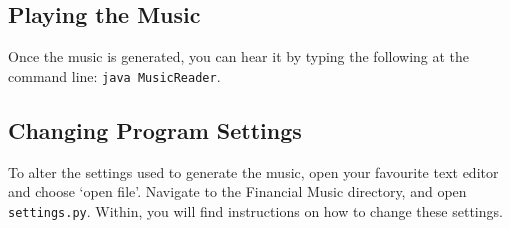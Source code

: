 \subsection*{Playing the Music}

Once the music is generated, you can hear it by typing the following at the command line: \texttt{java MusicReader}.

\subsection*{Changing Program Settings}

To alter the settings used to generate the music, open your favourite text editor and choose `open file'. Navigate to the Financial Music directory, and open \texttt{settings.py}. Within, you will find instructions on how to change these settings.